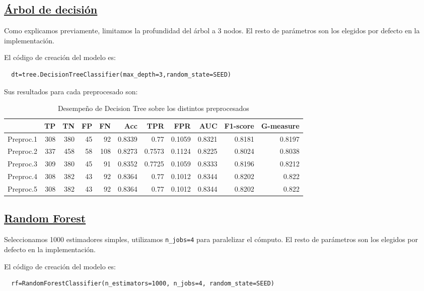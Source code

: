 \documentclass{article}
\begin{document}
\subsection{\href{https://scikit-learn.org/stable/modules/generated/sklearn.tree.DecisionTreeClassifier.html}{Árbol de decisión}}

Como explicamos previamente, limitamos la profundidad del árbol a 3
nodos. El resto de parámetros son los elegidos por defecto en la
implementación.

El código de creación del modelo es:
\begin{lstlisting}
  dt=tree.DecisionTreeClassifier(max_depth=3,random_state=SEED)
\end{lstlisting}

Sus resultados para cada preprocesado son:

\begin{table}[H]
\centering
\caption{Desempeño de Decision Tree sobre los distintos preprocesados}
\label{tab:dt}
\begin{tabular}{|lrrrrrrrrrr|}
\hline
 & TP & TN & FP & FN & Acc & TPR & FPR & AUC & F1-score & G-measure\\ \hline
  Preproc.1 & 308 & 380 & 45 & 92 & 0.8339 & 0.77 & 0.1059 & 0.8321 & 0.8181 & 0.8197\\
  Preproc.2 & 337 & 458 & 58 & 108 & 0.8273 & 0.7573 & 0.1124 & 0.8225 & 0.8024 & 0.8038\\
  Preproc.3 & 309 & 380 & 45 & 91 & 0.8352 & 0.7725 & 0.1059 & 0.8333 & 0.8196 & 0.8212\\
  Preproc.4 & 308 & 382 & 43 & 92 & 0.8364 & 0.77 & 0.1012 & 0.8344 & 0.8202 & 0.822\\
  Preproc.5 & 308 & 382 & 43 & 92 & 0.8364 & 0.77 & 0.1012 & 0.8344 & 0.8202 & 0.822\\
\hline
\end{tabular}
\end{table}

\subsection{\href{https://scikit-learn.org/stable/modules/generated/sklearn.ensemble.RandomForestClassifier.html}{Random Forest}}

Seleccionamos 1000 estimadores simples, utilizamos \texttt{n\_jobs=4}
para paralelizar el cómputo. El resto de parámetros son los elegidos
por defecto en la implementación.

El código de creación del modelo es:
\begin{lstlisting}
  rf=RandomForestClassifier(n_estimators=1000, n_jobs=4, random_state=SEED)
\end{lstlisting}
\end{document}
